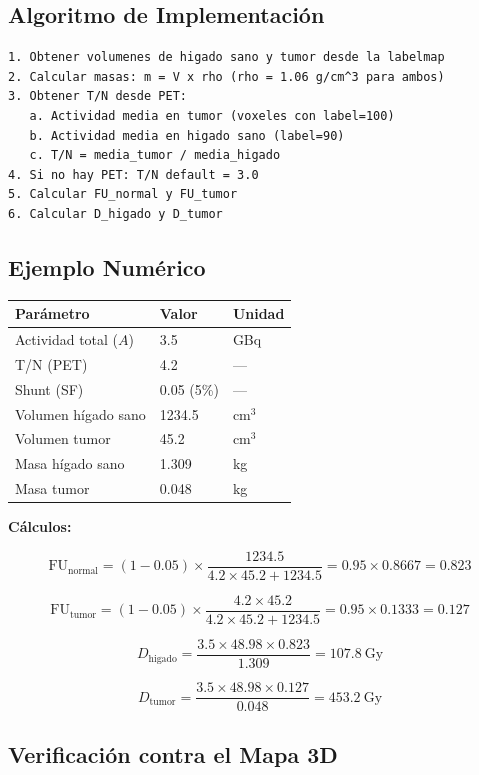 \documentclass[12pt,a4paper]{article}
\begin{document}
\subsection{Algoritmo de Implementación}

\begin{lstlisting}
1. Obtener volumenes de higado sano y tumor desde la labelmap
2. Calcular masas: m = V x rho (rho = 1.06 g/cm^3 para ambos)
3. Obtener T/N desde PET:
   a. Actividad media en tumor (voxeles con label=100)
   b. Actividad media en higado sano (label=90)
   c. T/N = media_tumor / media_higado
4. Si no hay PET: T/N default = 3.0
5. Calcular FU_normal y FU_tumor
6. Calcular D_higado y D_tumor
\end{lstlisting}

\subsection{Ejemplo Numérico}

\begin{tabular}{p{5cm} p{3cm} p{3cm}}
\toprule
\textbf{Parámetro} & \textbf{Valor} & \textbf{Unidad} \\
\midrule
Actividad total ($A$) & 3.5 & GBq \\
T/N (PET) & 4.2 & --- \\
Shunt (SF) & 0.05 (5\%) & --- \\
Volumen hígado sano & 1234.5 & cm$^3$ \\
Volumen tumor & 45.2 & cm$^3$ \\
Masa hígado sano & 1.309 & kg \\
Masa tumor & 0.048 & kg \\
\bottomrule
\end{tabular}

\textbf{Cálculos:}

$$\text{FU}_{\text{normal}} = (1 - 0.05) \times \frac{1234.5}{4.2 \times 45.2 + 1234.5} = 0.95 \times 0.8667 = 0.823$$

$$\text{FU}_{\text{tumor}} = (1 - 0.05) \times \frac{4.2 \times 45.2}{4.2 \times 45.2 + 1234.5} = 0.95 \times 0.1333 = 0.127$$

$$D_{\text{higado}} = \frac{3.5 \times 48.98 \times 0.823}{1.309} = 107.8\ \text{Gy}$$

$$D_{\text{tumor}} = \frac{3.5 \times 48.98 \times 0.127}{0.048} = 453.2\ \text{Gy}$$

\subsection{Verificación contra el Mapa 3D}
\end{document}
